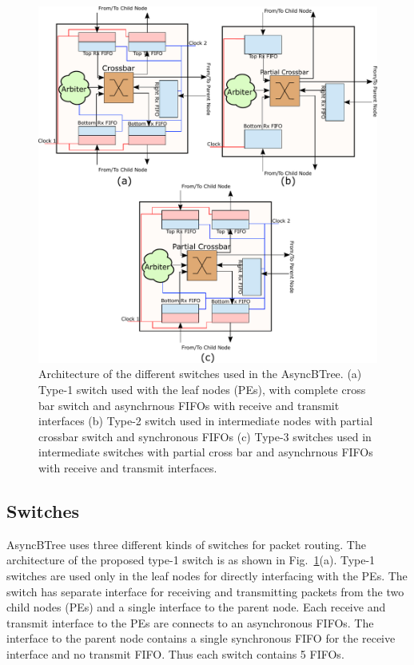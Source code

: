 \begin{figure}[t]
\centering
   \includegraphics[width=\columnwidth]{Figures/switch1_2.pdf}
   \caption{Architecture of the different switches used in the AsyncBTree. (a) Type-1 switch used with the leaf nodes (PEs), with complete cross bar switch and asynchrnous 
   FIFOs with receive and transmit interfaces (b) Type-2 switch used in intermediate nodes with partial crossbar switch and synchronous FIFOs (c) Type-3 switches used in intermediate
   switches with partial cross bar and asynchrnous FIFOs with receive and transmit interfaces.}
   \label{fig:switchArch}
\end{figure}

\subsection{Switches}
\label{sec:switch}
AsyncBTree uses three different kinds of switches for packet routing.
The architecture of the proposed type-1 switch is as shown in Fig.~\ref{fig:switchArch}(a).
Type-1 switches are used only in the leaf nodes for directly interfacing with the PEs.
The switch has separate interface for receiving and transmitting packets from the two child nodes (PEs) and a single interface to the parent node.
Each receive and transmit interface to the PEs are connects to an asynchronous FIFOs.
The interface to the parent node contains a single synchronous FIFO for the receive interface and no transmit FIFO.
Thus each switch contains 5 FIFOs.

